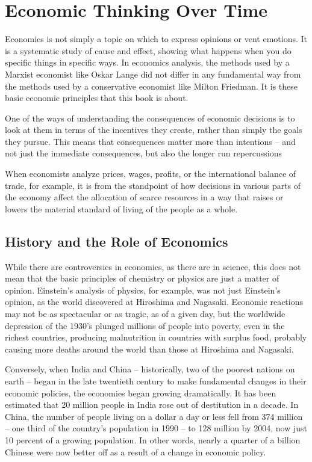 \section{Economic Thinking Over Time}

Economics is not simply a topic on which to express opinions or vent emotions. It is a systematic study of cause and effect, showing what happens when you do specific things in specific ways. In economics analysis, the methods used by a Marxist economist like Oskar Lange did not differ in any fundamental way from the methods used by a conservative economist like Milton Friedman. It is these basic economic principles that this book is about.

One of the ways of understanding the consequences of economic decisions is to look at them in terms of the incentives they create, rather than simply the goals they pursue. This means that consequences matter more than intentions – and not just the immediate consequences, but also the longer run repercussions 

When economists analyze prices, wages, profits, or the international balance of trade, for example, it is from the standpoint of how decisions in various parts of the economy affect the allocation of scarce resources in a way that raises or lowers the material standard of living of the people as a whole.

\subsection{History and the Role of Economics}

While there are controversies in economics, as there are in science, this does not mean that the basic principles of chemistry or physics are just a matter of opinion. Einstein’s analysis of physics, for example, was not just Einstein’s opinion, as the world discovered at Hiroshima and Nagasaki. Economic reactions may not be as spectacular or as tragic, as of a given day, but the worldwide depression of the 1930’s plunged millions of people into poverty, even in the richest countries, producing malnutrition in countries with surplus food, probably causing more deaths around the world than those at Hiroshima and Nagasaki.

Conversely, when India and China – historically, two of the poorest nations on earth – began in the late twentieth century to make fundamental changes in their economic policies, the economies began growing dramatically. It has been estimated that 20 million people in India rose out of destitution in a decade. In China, the number of people living on a dollar a day or less fell from 374 million – one third of the country’s population in 1990 – to 128 million by 2004, now just 10 percent of a growing population. In other words, nearly a quarter of a billion Chinese were now better off as a result of a change in economic policy.

